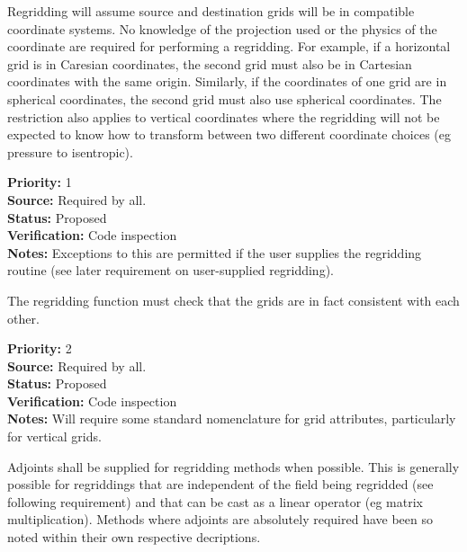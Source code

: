 Regridding will assume source and destination grids will be
in compatible coordinate systems.  No knowledge of
the projection used or the physics of the coordinate are
required for performing a regridding.  For example, if a 
horizontal grid is in Caresian coordinates, the second grid 
must also be in Cartesian coordinates with the same origin.
Similarly, if the coordinates of one grid are in spherical 
coordinates, the second grid must also use spherical 
coordinates.  The restriction
also applies to vertical coordinates where the regridding
will not be expected to know how to transform between
two different coordinate choices (eg pressure to isentropic).

\begin{reqlist}
{\bf Priority:} 1 \\
{\bf Source:} Required by all. \\
{\bf Status:} Proposed \\
{\bf Verification:} Code inspection  \\
{\bf Notes:} Exceptions to this are permitted if the user
             supplies the regridding routine (see later
             requirement on user-supplied regridding).
\end{reqlist}


The regridding function must check that the grids are in fact consistent
with each other.

\begin{reqlist}
{\bf Priority:} 2 \\
{\bf Source:} Required by all. \\
{\bf Status:} Proposed \\
{\bf Verification:} Code inspection  \\
{\bf Notes:} Will require some standard nomenclature for grid attributes,
             particularly for vertical grids.
\end{reqlist}


Adjoints shall be supplied for regridding methods when possible.  This is 
generally possible for regriddings that are independent of the field being 
regridded (see following requirement) and that can be cast as a linear 
operator (eg matrix multiplication).  Methods where adjoints are absolutely 
required have been so noted within their own respective decriptions.

